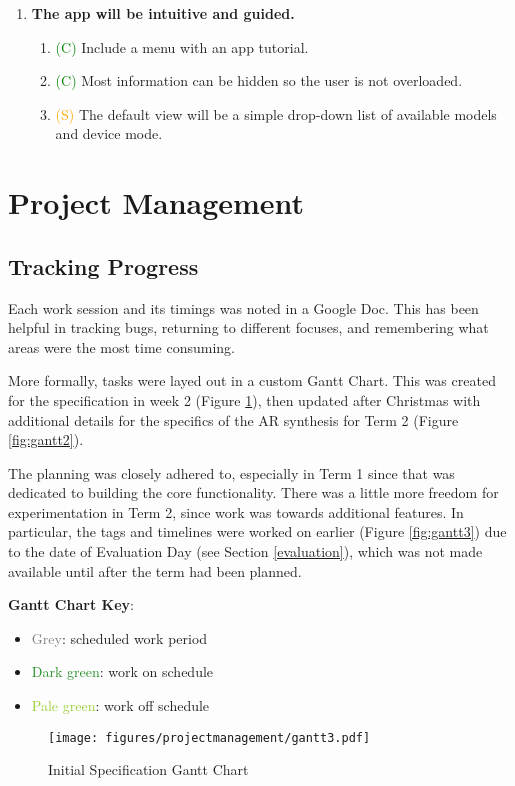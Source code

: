 \documentclass{article}
\newcommand{\light}[1]{\textcolor{gray}{#1}}
\newcommand{\should}[1]{\textcolor{orange}{#1}}
\newcommand{\could}[1]{\textcolor{green}{#1}}
\begin{document}
\begin{enumerate}[label=\Roman*.]
\item \textbf{The app will be intuitive and guided.}
    \begin{enumerate}[label=\arabic*.]
    \item \could{(C)} Include a menu with an app tutorial.
    \item \could{(C)} Most information can be hidden so the user is not overloaded.
    \item \should{(S)} The default view will be a simple drop-down list of available models and device mode.
    \end{enumerate}
\end{enumerate}

\section{Project Management}
\subsection{Tracking Progress}
Each work session and its timings was noted in a Google Doc. This has been helpful in tracking bugs, returning to different focuses, and remembering what areas were the most time consuming.

More formally, tasks were layed out in a custom Gantt Chart. This was created for the specification in week 2 (Figure \ref{fig:gantt1}), then updated after Christmas with additional details for the specifics of the AR synthesis for Term 2 (Figure \ref{fig:gantt2}). 

The planning was closely adhered to, especially in Term 1 since that was dedicated to building the core functionality. There was a little more freedom for experimentation in Term 2, since work was towards additional features. In particular, the tags and timelines were worked on earlier (Figure \ref{fig:gantt3}) due to the date of Evaluation Day (see Section \ref{evaluation}), which was not made available until after the term had been planned.

\textbf{Gantt Chart Key}: 
\begin{itemize}
    \item \light{Grey}: scheduled work period
    \item \textcolor{ForestGreen}{Dark green}: work on schedule
    \item \textcolor{YellowGreen}{Pale green}: work off schedule
\end{itemize}

\begin{figure}
    \texttt{[image: figures/projectmanagement/gantt3.pdf]}
        \caption{Initial Specification Gantt Chart}
        \label{fig:gantt1}
\end{figure}
\end{document}
